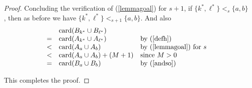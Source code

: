 \documentclass[12pt]{article}
\theoremstyle{definition}
\newcommand{\set}[1]{\{ #1 \}}
\newcommand{\card}{\mbox{card}}
\begin{document}
\begin{proof}
Concluding the verification of (\ref{lemmagoal}) for $s+1$,
 if  $\set{k^*, \ell^*} <_s \set{a,b}$, then  as before  we have $\set{k^*, \ell^*} <_{s+1} \set{a,b}$.
And also 
\[
\begin{array}{cll}
  & \card(B_{k^*} \cup  B_{\ell^*})\\
 =  & \card({A}_{k^*} \cup  {A}_{\ell^*}) 
   & \mbox{by (\ref{defh})}\\
<  &  \card({A}_{a} \cup  {A}_{b})   & \mbox{by (\ref{lemmagoal}) for $s$}  \\
<  &  \card({A}_{a} \cup  {A}_{b}) + (M+1)  & \mbox{since $M>0$}  \\
= & \card(B_{a} \cup  B_{b}) & \mbox{by (\ref{andso})}\\
\end{array}
\]

This completes the proof. \end{proof} 
  
  
\end{document}
